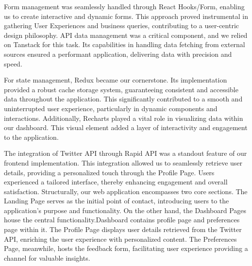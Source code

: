 \documentclass[a4paper,12pt]{article}
\begin{document}
{{{Form management was seamlessly handled through React Hooks/Form, enabling us to create interactive and dynamic forms. This approach proved instrumental in gathering User Experiences and business queries, contributing to a user-centric design philosophy. API data management was a critical component, and we relied on Tanstack for this task. Its capabilities in handling data fetching from external sources ensured a performant application, delivering data with precision and speed.

For state management, Redux became our cornerstone. Its implementation provided a robust cache storage system, guaranteeing consistent and accessible data throughout the application. This significantly contributed to a smooth and uninterrupted user experience, particularly in dynamic components and interactions. Additionally, Recharts played a vital role in visualizing data within our dashboard. This visual element added a layer of interactivity and engagement to the application.

The integration of Twitter API through Rapid API was a standout feature of our frontend implementation. This integration allowed us to seamlessly retrieve user details, providing a personalized touch through the Profile Page. Users experienced a tailored interface, thereby enhancing engagement and overall satisfaction. Structurally, our web application encompasses two core sections. The Landing Page serves as the initial point of contact, introducing users to the application's purpose and functionality. On the other hand, the Dashboard Pages house the central functionality.Dashboard contains profile page and preferences page within it. The Profile Page displays user details retrieved from the Twitter API, enriching the user experience with personalized content. The Preferences Page, meanwhile, hosts the feedback form, facilitating user experience providing a channel for valuable insights.

  


}}}
\end{document}
